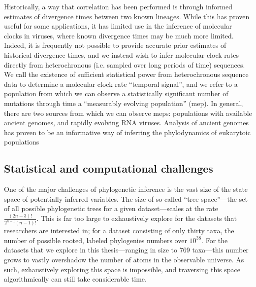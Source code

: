 Historically, a way that correlation has been performed is through informed estimates of divergence times between two known lineages\cite{humanApeDivergence}.
While this has proven useful for some applications, it has limited use in the inference of molecular clocks in viruses, where known divergence times may be much more limited.
Indeed, it is frequently not possible to provide accurate prior estimates of historical divergence times, and we instead wish to infer molecular clock rates directly from heterochronous (i.e. sampled over long periods of time) sequences.
We call the existence of sufficient statistical power from heterochronous sequence data to determine a molecular clock rate ``temporal signal'', and we refer to a population from which we can observe a statistically significant number of mutations through time a ``measurably evolving population'' (\gls{mep})\cite{drummond2003MEP}.
In general, there are two sources from which we can observe \gls{mep}s: populations with available ancient genomes, and rapidly evolving RNA viruses.
Analysis of ancient genomes has proven to be an informative way of inferring the phylodynamics of eukarytoic populations\cite{shapiro2004bison}


\subsection{Statistical and computational challenges} %

One of the major challenges of phylogenetic inference is the vast size of the state space of potentially inferred variables.
The size of so-called ``tree space''---the set of all possible phylogenetic trees for a given dataset---scales at the rate $\frac{(2n-3)!}{2^{n-1}(n-1)!}$.
This is far too large to exhaustively explore for the datasets that researchers are interested in; for a dataset consisting of only thirty taxa, the number of possible rooted, labeled phylogenies numbers over $10^{38}$\cite{felsenstein2003inferring}.
For the datasets that we explore in this thesis---ranging in size to 769 taxa---this number grows to vastly overshadow the number of atoms in the observable universe.
As such, exhaustively exploring this space is impossible, and traversing this space algorithmically can still take considerable time.

